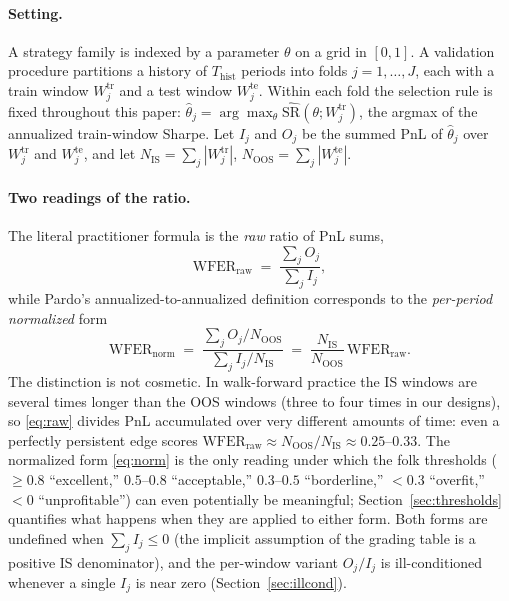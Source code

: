 \documentclass[11pt]{article}
\newcommand{\wfer}{\mathrm{WFER}}
\begin{document}
\paragraph{Setting.} A strategy family is indexed by a parameter
$\theta$ on a grid in $[0,1]$. A validation procedure partitions a history of
$T_{\mathrm{hist}}$ periods into folds $j=1,\dots,J$, each with a train
window $W_j^{\mathrm{tr}}$ and a test window $W_j^{\mathrm{te}}$. Within each
fold the selection rule is fixed throughout this paper:
$\hat\theta_j = \arg\max_\theta \widehat{\mathrm{SR}}(\theta;
W_j^{\mathrm{tr}})$, the argmax of the annualized train-window Sharpe. Let
$I_j$ and $O_j$ be the summed PnL of $\hat\theta_j$ over
$W_j^{\mathrm{tr}}$ and $W_j^{\mathrm{te}}$, and let
$N_{\mathrm{IS}}=\sum_j |W_j^{\mathrm{tr}}|$,
$N_{\mathrm{OOS}}=\sum_j |W_j^{\mathrm{te}}|$.

\paragraph{Two readings of the ratio.} The literal practitioner formula is the
\emph{raw} ratio of PnL sums,
\begin{equation}
\wfer_{\mathrm{raw}} \;=\; \frac{\sum_j O_j}{\sum_j I_j},
\label{eq:raw}
\end{equation}
while Pardo's annualized-to-annualized definition corresponds to the
\emph{per-period normalized} form
\begin{equation}
\wfer_{\mathrm{norm}} \;=\;
\frac{\sum_j O_j / N_{\mathrm{OOS}}}{\sum_j I_j / N_{\mathrm{IS}}}
\;=\; \frac{N_{\mathrm{IS}}}{N_{\mathrm{OOS}}}\,\wfer_{\mathrm{raw}}.
\label{eq:norm}
\end{equation}
The distinction is not cosmetic. In walk-forward practice the IS windows are
several times longer than the OOS windows (three to four times in our
designs), so \eqref{eq:raw} divides PnL accumulated over very different
amounts of time: even a perfectly persistent edge scores
$\wfer_{\mathrm{raw}} \approx N_{\mathrm{OOS}}/N_{\mathrm{IS}} \approx
0.25$--$0.33$. The normalized form \eqref{eq:norm} is the only reading under
which the folk thresholds ($\ge 0.8$ ``excellent,'' $0.5$--$0.8$
``acceptable,'' $0.3$--$0.5$ ``borderline,'' $<0.3$ ``overfit,'' $<0$
``unprofitable'') can even potentially be meaningful; Section~\ref{sec:thresholds}
quantifies what happens when they are applied to either form. Both forms are
undefined when $\sum_j I_j \le 0$ (the implicit assumption of the grading
table is a positive IS denominator), and the per-window variant $O_j/I_j$ is
ill-conditioned whenever a single $I_j$ is near zero
(Section~\ref{sec:illcond}).
\end{document}
